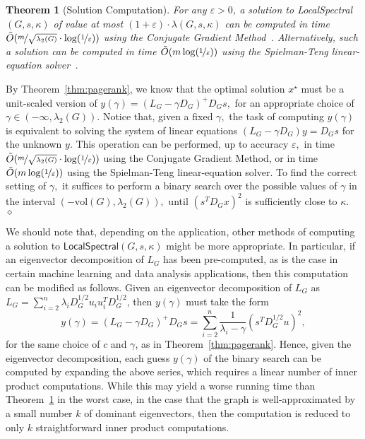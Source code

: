 \documentclass[11pt]{article}
\newtheorem{theorem}{Theorem}
\newenvironment{proof}{\noindent {\em Proof:}}{\\\hspace*{\fill}\mbox{$\diamond$}}
\newcommand{\nfrac}{\nicefrac}
\newcommand{\vol}{\mathrm{vol}}
\begin{document}
\begin{theorem}[Solution Computation]
\label{thm:comp}
For any $\varepsilon >0$, a solution to \textsf{LocalSpectral}$(G,s,\kappa)$ 
of value at most $(1+\varepsilon )\cdot \lambda (G,s,\kappa)$ can be 
computed in time 
$\tilde{O}(\nfrac{m}{\sqrt{\lambda_{2}(G)}} \cdot \log(\nfrac{1}{\varepsilon }))$ 
using the Conjugate Gradient Method~\cite{GVL96}. 
Alternatively, such a solution can be computed in time 
$\tilde{O}(m \log(\nfrac{1}{\varepsilon }))$ using the Spielman-Teng 
linear-equation solver~\cite{Spielman:2004}. 
\end{theorem}
\begin{proof}
By Theorem~\ref{thm:pagerank}, we know that the optimal solution $x^\star$ must be a unit-scaled version of 
$y(\gamma) =(L_{G}-\gamma D_G)^{+} D_G s,$ for an appropriate choice of $\gamma \in (-\infty, \lambda_{2}(G)).$
Notice that, given a fixed $\gamma,$ the task of computing $y(\gamma)$ is equivalent to solving the system of linear equations
$(L_{G}-\gamma D_G) y = D_{G}s$ for the unknown $y.$ This operation can be performed, up to accuracy $\varepsilon ,$ in time $\tilde{O}(\nfrac{m}{\sqrt{\lambda_{2}(G)}} \cdot \log(\nfrac{1}{\varepsilon }))$ 
using the Conjugate Gradient Method, or  in time 
$\tilde{O}(m \log(\nfrac{1}{\varepsilon }))$ using the Spielman-Teng linear-equation 
solver.
To find the correct setting of $\gamma,$ it suffices to perform a binary search over the possible values of $\gamma$ in the interval $(-\vol(G), \lambda_2(G)),$ until $(s^T D_{G} x)^2$ is sufficiently close to $\kappa.$ 
\end{proof}

\noindent
We should note that, depending on the application, other methods of 
computing a solution to $\textsf{LocalSpectral}(G,s,\kappa)$ might be more 
appropriate.
In particular, if an eigenvector decomposition of $L_G$ has been 
pre-computed, as is the case in certain machine learning and data analysis 
applications, then this computation can be modified as follows.
Given an eigenvector decomposition of $L_G$ as 
$ L_G = \sum_{i=2}^n \lambda_i D_G^{1/2} u_i u_i^T D_G^{1/2} $, then
$y(\gamma)$ must take the form
$$
y(\gamma) = (L_{G}-\gamma D_G)^{+} D_G s= \sum_{i=2}^n \frac{1}{\lambda_i - \gamma} (s^T D_G^{1/2} u)^2  ,
$$
for the same choice of $c$ and $\gamma$, as in Theorem~\ref{thm:pagerank}. 
Hence, given the eigenvector decomposition, each guess $y(\gamma)$ of the 
binary search can be computed by expanding the above series, which requires 
a linear number of inner product computations.
While this may yield a worse running time than Theorem~\ref{thm:comp} in 
the worst case, in the case that the graph is well-approximated by a small 
number $k$ of dominant eigenvectors, then the computation is reduced to 
only $k$ straightforward inner product computations.
\end{document}
